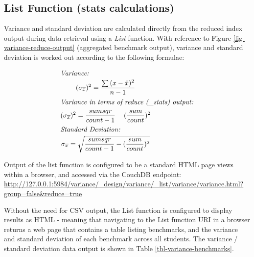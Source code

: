 \subsection{List Function (stats calculations)}
Variance and standard deviation are calculated directly from the reduced index output during data retrieval using a \textit{List} function. With reference to Figure \ref{fig-variance-reduce-output} (aggregated benchmark output), variance and standard deviation is worked out according to the following formulae: \begin{spreadlines}{15pt}
  \begin{gather*}
    \intertext{\textit{Variance:}}
    (\sigma_{\overline{x}})^{2} = \frac{\sum{(x-\bar{x})^2}}{n-1}\\
    \intertext{\textit{Variance in terms of reduce (\_stats) output:}}
    (\sigma_{\overline{x}})^{2} = \frac{sumsqr}{count-1} - (\frac{sum}{count})^{2}\\
    \intertext{\textit{Standard Deviation:}}
    \sigma_{\overline{x}} = \sqrt{\frac{sumsqr}{count-1} - (\frac{sum}{count})^{2}}
  \end{gather*}
\end{spreadlines}

Output of the list function is configured to be a standard HTML page views within a browser, and accessed via the CouchDB endpoint: \url{http://127.0.0.1:5984/variance/_design/variance/_list/variance/variance.html?group=false&reduce=true}

Without the need for CSV output, the List function is configured to display results as HTML - meaning that navigating to the List function URI in a browser returns a web page that contains a table listing benchmarks, and the variance and standard deviation of each benchmark across all students. The variance / standard deviation data output is shown in Table \ref{tbl-variance-benchmarks}.

